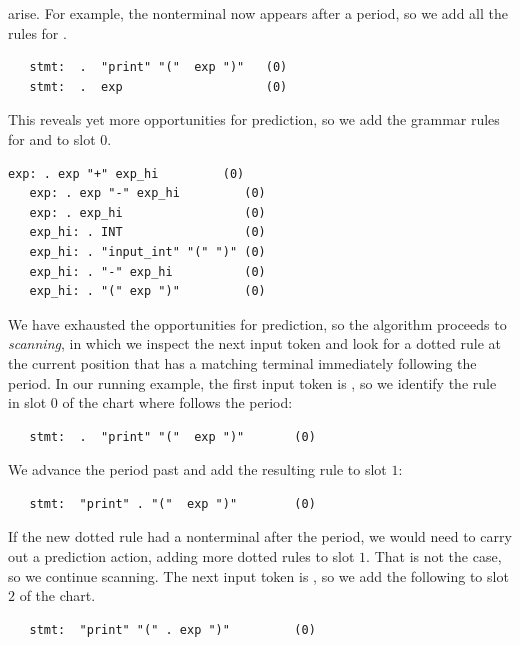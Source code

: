 \documentclass[7x10]{TimesAPriori_MIT}%
\numberwithin{theorem}{chapter}
\numberwithin{definition}{chapter}
\numberwithin{equation}{chapter}
\begin{document}
{arise. For example, the  nonterminal now appears after a
period, so we add all the rules for .
\begin{lstlisting}
   stmt:  .  "print" "("  exp ")"   (0)
   stmt:  .  exp                    (0)
\end{lstlisting}
This reveals yet more opportunities for prediction, so we add the grammar
rules for  and  to slot $0$.
\begin{lstlisting}[escapechar=$]
   exp: . exp "+" exp_hi         (0)
   exp: . exp "-" exp_hi         (0)
   exp: . exp_hi                 (0)
   exp_hi: . INT                 (0)
   exp_hi: . "input_int" "(" ")" (0)
   exp_hi: . "-" exp_hi          (0)
   exp_hi: . "(" exp ")"         (0)
\end{lstlisting}

We have exhausted the opportunities for prediction, so the algorithm
proceeds to \emph{scanning}, in which we inspect the next input token
and look for a dotted rule at the current position that has a matching
terminal immediately following the period. In our running example, the
first input token is , so we identify the rule in slot
$0$ of the chart where  follows the period:
\begin{lstlisting}
   stmt:  .  "print" "("  exp ")"       (0)
\end{lstlisting}
We advance the period past  and add the resulting rule
to slot $1$:
\begin{lstlisting}
   stmt:  "print" . "("  exp ")"        (0)
\end{lstlisting}
If the new dotted rule had a nonterminal after the period, we would
need to carry out a prediction action, adding more dotted rules to
slot $1$. That is not the case, so we continue scanning. The next
input token is , so we add the following to slot $2$ of the
chart.
\begin{lstlisting}
   stmt:  "print" "(" . exp ")"         (0)
\end{lstlisting}

}
\end{document}
